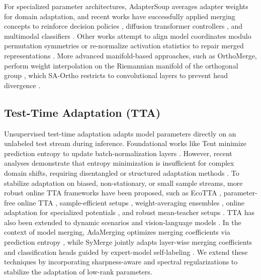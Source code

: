 \documentclass{article}
\theoremstyle{plain}
\theoremstyle{definition}
\theoremstyle{remark}
\begin{document}
For specialized parameter architectures, AdapterSoup \cite{chronopoulou2023adaptersoup} averages adapter weights for domain adaptation, and recent works have successfully applied merging concepts to reinforce decision policies \cite{lawson2023merging}, diffusion transformer controllers \cite{reuss2024efficient}, and multimodal classifiers \cite{altameemi2023multi}. Other works attempt to align model coordinates modulo permutation symmetries \cite{ainsworth2022git, stoica2023zipit} or re-normalize activation statistics to repair merged representations \cite{jordan2022repair}. More advanced manifold-based approaches, such as OrthoMerge, perform weight interpolation on the Riemannian manifold of the orthogonal group \cite{yang2026orthomerge}, which SA-Ortho restricts to convolutional layers to prevent head divergence \cite{marczak2025saim}.

\subsection{Test-Time Adaptation (TTA)}
Unsupervised test-time adaptation adapts model parameters directly on an unlabeled test stream during inference. Foundational works like Tent minimize prediction entropy to update batch-normalization layers \cite{wang2021tent}. However, recent analyses demonstrate that entropy minimization is insufficient for complex domain shifts, requiring disentangled or structured adaptation methods \cite{lee2024entropy}. To stabilize adaptation on biased, non-stationary, or small sample streams, more robust online TTA frameworks have been proposed, such as EcoTTA \cite{song2023ecotta}, parameter-free online TTA \cite{boudiaf2022parameter}, sample-efficient setups \cite{yu2025sample}, weight-averaging ensembles \cite{bahri2024test}, online adaptation for specialized potentials \cite{cui2025online}, and robust mean-teacher setups \cite{dobler2022robust}. TTA has also been extended to dynamic scenarios \cite{yuan2023robust} and vision-language models \cite{karmanov2024efficient}. In the context of model merging, AdaMerging optimizes merging coefficients via prediction entropy \cite{yang2024adamerging}, while SyMerge jointly adapts layer-wise merging coefficients and classification heads guided by expert-model self-labeling \cite{jung2025symerge}. We extend these techniques by incorporating sharpness-aware and spectral regularizations to stabilize the adaptation of low-rank parameters.
\end{document}
